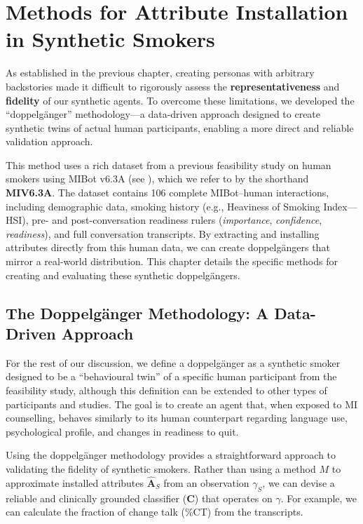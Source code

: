 \chapter{Methods for Attribute Installation in Synthetic Smokers}
\label{ch:synthetic-doppelganger}

As established in the previous chapter, creating personas with arbitrary backstories made it difficult to rigorously assess the \textbf{representativeness} and \textbf{fidelity} of our synthetic agents. To overcome these limitations, we developed the ``doppelgänger'' methodology—a data-driven approach designed to create synthetic twins of actual human participants, enabling a more direct and reliable validation approach.

This method uses a rich dataset from a previous feasibility study on human smokers using MIBot v6.3A (see ), which we refer to by the shorthand \textbf{MIV6.3A}. The dataset contains 106 complete MIBot--human interactions, including demographic data, smoking history (e.g., Heaviness of Smoking Index---HSI), pre- and post-conversation readiness rulers (\emph{importance}, \emph{confidence}, \emph{readiness}), and full conversation transcripts. By extracting and installing attributes directly from this human data, we can create doppel\-gängers that mirror a real-world distribution. This chapter details the specific methods for creating and evaluating these synthetic doppel\-gängers.

\section{The Doppelgänger Methodology: A Data-Driven Approach}
\label{sec:synthetic-smoker-doppelgänger}

For the rest of our discussion, we define a doppel\-gänger as a synthetic smoker designed to be a ``behavioural twin'' of a specific human participant from the feasibility study, although this definition can be extended to other types of participants and studies. The goal is to create an agent that, when exposed to MI counselling, behaves similarly to its human counterpart regarding language use, psychological profile, and changes in readiness to quit.

Using the doppel\-gänger methodology provides a straightforward approach to validating the fidelity of synthetic smokers. Rather than using a method $M$ to approximate installed attributes $\hat{\textbf{A}}_S$ from an observation $\gamma_S$, we can devise a reliable and clinically grounded classifier ($\textbf{C}$) that operates on $\gamma$. For example, we can calculate the fraction of change talk (\%CT) from the transcripts.


